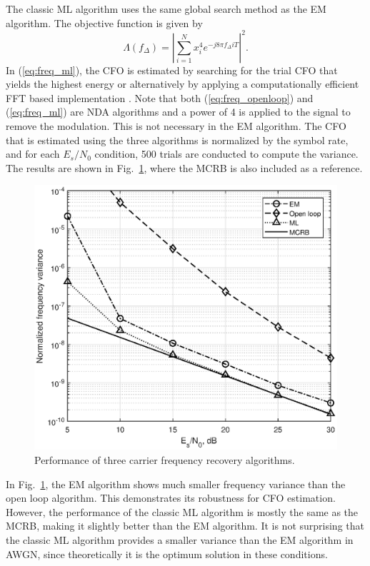 \documentclass[12pt, draftclsnofoot, onecolumn]{IEEEtran}
\begin{document}
The classic ML algorithm uses the same global search method as the EM algorithm.
The objective function is given by 
\begin{equation}
\Lambda (f_\Delta)=\left| \sum\limits_{i = 1}^N {{{ {{x^4_i}e^{-j8\pi f_\Delta i T}}}}} \right|^2. 
\label{eq:freq_ml}
\end{equation}
In (\ref{eq:freq_ml}), the CFO is estimated by searching for the trial CFO that yields the highest energy or alternatively by applying a computationally efficient FFT based implementation \cite{Wang2004}.
Note that both (\ref{eq:freq_openloop}) and (\ref{eq:freq_ml}) are NDA algorithms and a power of 4 is applied to the signal to remove the modulation.
This is not necessary in the EM algorithm.
The CFO that is estimated using the three algorithms is normalized by the symbol rate,
and for each \(E_s/N_0\) condition, 500 trials are conducted to compute the variance.
The results are shown in Fig.~\ref{fig:per_freq}, where the MCRB is also included as a reference.

\begin{figure}[ht]
\centering
\includegraphics[width=3.1 in]{pic/per_freq-k.eps}
\caption{Performance of three carrier frequency recovery algorithms.}
\label{fig:per_freq} 
\end{figure} 

In Fig.~\ref{fig:per_freq}, the EM algorithm shows much smaller frequency variance than the open loop algorithm. 
This demonstrates its robustness for CFO estimation.
However, the performance of the classic ML algorithm is mostly the same as the MCRB, making it slightly better than the EM algorithm.
It is not surprising that the classic ML algorithm provides a smaller variance than the EM algorithm in AWGN, since theoretically it is the optimum solution in these conditions. 
\end{document}
